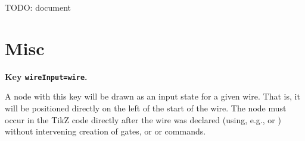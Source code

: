 \documentclass[a4paper]{article}
\makeatletter
\newenvironment{key}[2]{%
  \medskip\noindent\textbf{Key \keyanchor{#1}\texttt{#2}.} 
}{%
}
\newcommand\nobsstring[1]{{\escapechar=-1\xdef\@tempa{\string#1}}}
\DeclareRobustCommand\macrolink[1]{\nobsstring#1\hyperref[command-\@tempa]{\texttt{\string#1}}}
\DeclareRobustCommand\keyanchor[1]{\label{key-#1}\texttt{#1}}
\makeatother
\begin{document}
TODO: document


\begin{example}
\end{example}


\section{Misc}


\begin{key}{wireInput}{=wire}
  A node with this key will be drawn as an input state for a given
  wire.  That is, it will be positioned directly on the left of the
  start of the wire. The node must occur in the TikZ code directly
  after the wire was declared (using, e.g., \macrolink{\newWire} or
  \macrolink{\newWires}) without intervening creation of gates, or
  \macrolink{\skipWire} or \macrolink{\drawWire} commands.

\begin{example}
\end{example}
\end{key}
\end{document}
